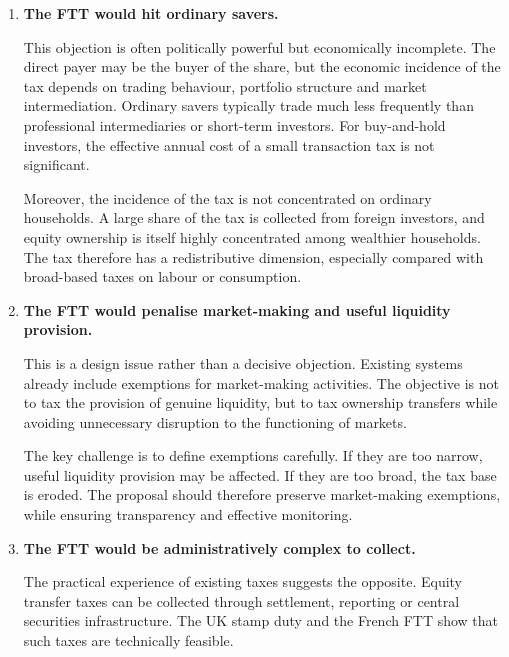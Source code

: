 \documentclass[../../main]{subfiles}
\begin{document}
\begin{enumerate}
    The main remaining issue is substitution towards untaxed instruments or arrangements, including derivatives. This is a valid concern. However, the proposal examined here is deliberately conservative and focuses on the most robust part of the tax base: equity ownership transfers. Additional anti-avoidance rules could be considered if substitution became significant, but the existence of possible avoidance margins is not a reason to abandon the tax altogether.

    \item \textbf{The FTT would hit ordinary savers.}

    This objection is often politically powerful but economically incomplete. The direct payer may be the buyer of the share, but the economic incidence of the tax depends on trading behaviour, portfolio structure and market intermediation. Ordinary savers typically trade much less frequently than professional intermediaries or short-term investors. For buy-and-hold investors, the effective annual cost of a small transaction tax is not significant.

    Moreover, the incidence of the tax is not concentrated on ordinary households. A large share of the tax is collected from foreign investors, and equity ownership is itself highly concentrated among wealthier households. The tax therefore has a redistributive dimension, especially compared with broad-based taxes on labour or consumption.

    \item \textbf{The FTT would penalise market-making and useful liquidity provision.}

    This is a design issue rather than a decisive objection. Existing systems already include exemptions for market-making activities. The objective is not to tax the provision of genuine liquidity, but to tax ownership transfers while avoiding unnecessary disruption to the functioning of markets.

    The key challenge is to define exemptions carefully. If they are too narrow, useful liquidity provision may be affected. If they are too broad, the tax base is eroded. The proposal should therefore preserve market-making exemptions, while ensuring transparency and effective monitoring.

    \item \textbf{The FTT would be administratively complex to collect.}

    The practical experience of existing taxes suggests the opposite. Equity transfer taxes can be collected through settlement, reporting or central securities infrastructure. The UK stamp duty and the French FTT show that such taxes are technically feasible.


\end{enumerate}
\end{document}
